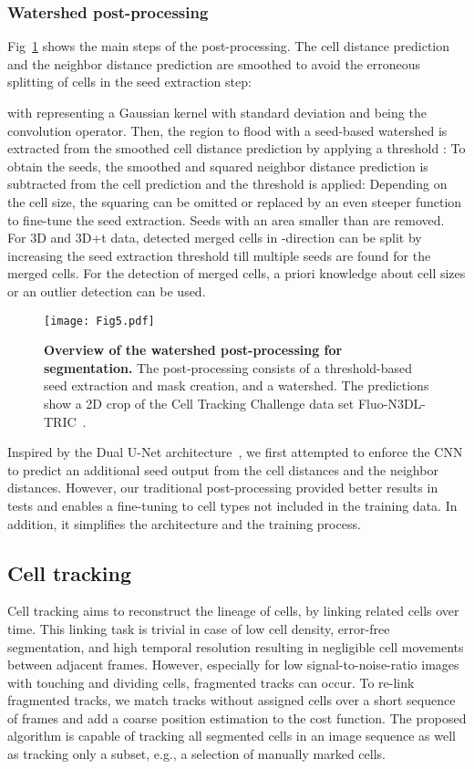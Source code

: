 \documentclass[10pt,letterpaper]{article}
\begin{document}
\subsubsection*{Watershed post-processing}
Fig~\ref{fig:post-processing} shows the main steps of the post-processing. The cell distance prediction  and the neighbor distance prediction  are smoothed to avoid the erroneous splitting of cells in the seed extraction step:

with  representing a Gaussian kernel with standard deviation  and  being the convolution operator. Then, the region to flood  with a seed-based watershed is extracted from the smoothed cell distance prediction by applying a threshold :
To obtain the seeds, the smoothed and squared neighbor distance prediction is subtracted from the cell prediction and the threshold  is applied:
Depending on the cell size, the squaring can be omitted or replaced by an even steeper function to fine-tune the seed extraction. Seeds with an area smaller than  are removed. For 3D and 3D+t data, detected merged cells in -direction can be split by increasing the seed extraction threshold  till multiple seeds are found for the merged cells. For the detection of merged cells, a priori knowledge about cell sizes or an outlier detection can be used.
\begin{figure}
\begin{adjustwidth}{-2.25in}{0in}
\centering
\texttt{[image: Fig5.pdf]}
\caption{\textbf{Overview of the watershed post-processing for segmentation.} The post-processing consists of a threshold-based seed extraction and mask creation, and a watershed. The predictions show a 2D crop of the Cell Tracking Challenge data set Fluo-N3DL-TRIC~\cite{Ulman2017, Maska2014}.}
\label{fig:post-processing}
\end{adjustwidth}
\end{figure}

Inspired by the Dual U-Net architecture~\cite{Li2019}, we first attempted to enforce the CNN to predict an additional seed output from the cell distances and the neighbor distances. However, our traditional post-processing provided better results in tests and enables a fine-tuning to cell types not included in the training data. In addition, it simplifies the architecture and the training process.

\subsection*{Cell tracking}
Cell tracking aims to reconstruct the lineage of cells, by linking related cells over time. This linking task is trivial in case of low cell density, error-free segmentation, and high temporal resolution resulting in negligible cell movements between adjacent frames. However, especially for low signal-to-noise-ratio images with touching and dividing cells, fragmented tracks can occur. To re-link fragmented tracks, we match tracks without assigned cells over a short sequence of frames and add a coarse position estimation to the cost function. The proposed algorithm is capable of tracking all segmented cells in an image sequence as well as tracking only a subset, e.g., a selection of manually marked cells.
\end{document}
